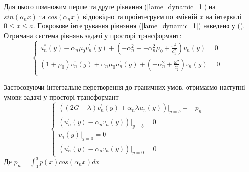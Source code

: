 Для цього помножим перше та друге рівняння (\ref{lame_dynamic_1}) на $sin(\alpha_n x)$ та $cos(\alpha_n x)$ відповідно та проінтегруєм по змінній $x$ на інтервалі $0 \le x \le a$.
Покрокове інтегрування рівняння (\ref{lame_dynamic_1}) наведено у ().
Отримана система рівнянь задачі у просторі трансформант:
\begin{equation}\label{transf_dynamic_1}
    \begin{cases}
        u_n^{''}(y) - \alpha_n \mu_0 v_n^{'}(y) + (-\alpha_n^2 - -\alpha_n^2 \mu_0 + \frac{\omega^2}{c_1^2}) u_n(y) = 0 \\
        (1 + \mu_0) v_n^{''}(y) + \alpha_n \mu_0 u_n^{'}(y) + (- \alpha_n^2 + \frac{\omega^2}{c_2^2}) v_n(y) = 0 \\
    \end{cases}
\end{equation}

Застосовуючи інтегральне перетворення до граничних умов,
отримаємо наступні умови задачі у просторі трансформант
\begin{equation}\label{transf_bound_dynamic_1}
    \begin{cases}
        \left( (2G + \lambda)v_n^{'}(y) + \alpha_n \lambda u_n(y) \right)|_{y=b} = -p_n \\
        \left(u_n^{'}(y) - \alpha_n v_n(y)  \right)|_{y=b} = 0 \\
        v_n(y)|_{y=0} = 0 \\
        \left(u_n^{'}(y) - \alpha_n v_n(y)  \right)|_{y=0} = 0
    \end{cases}
\end{equation}
Де $p_n = \int_{0}^{a} p(x) cos(\alpha_n x) dx$

